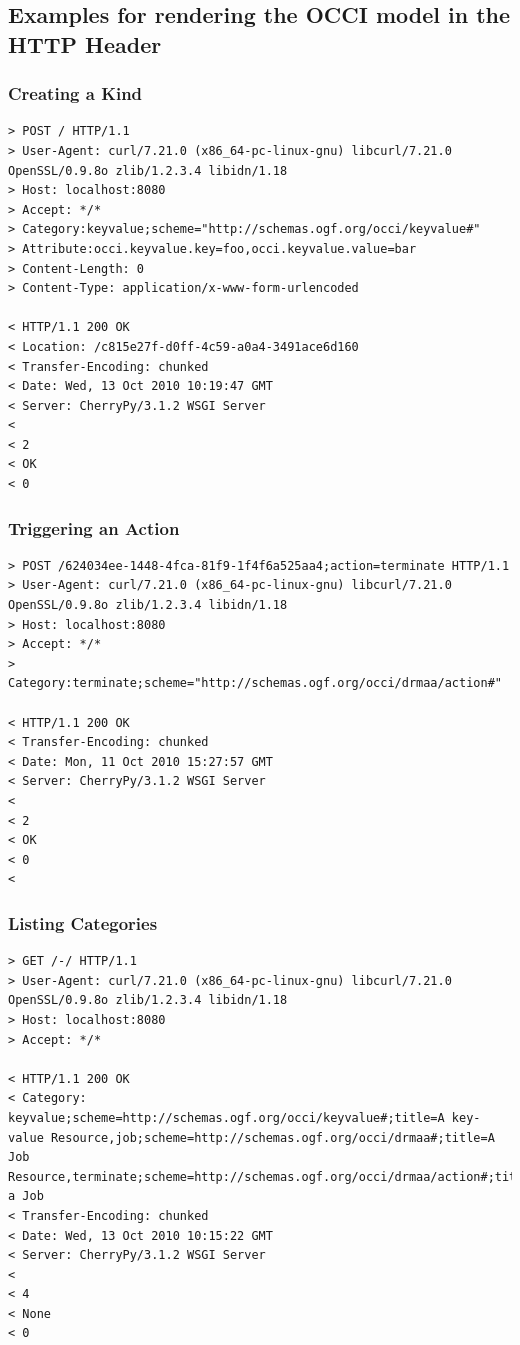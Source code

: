 \documentclass[10pt,a4paper]{article}
\begin{document}
\subsection{Examples for rendering the OCCI model in the HTTP Header}

\subsubsection{Creating a Kind}
\begin{verbatim}
> POST / HTTP/1.1
> User-Agent: curl/7.21.0 (x86_64-pc-linux-gnu) libcurl/7.21.0 OpenSSL/0.9.8o zlib/1.2.3.4 libidn/1.18
> Host: localhost:8080
> Accept: */*
> Category:keyvalue;scheme="http://schemas.ogf.org/occi/keyvalue#"
> Attribute:occi.keyvalue.key=foo,occi.keyvalue.value=bar
> Content-Length: 0
> Content-Type: application/x-www-form-urlencoded

< HTTP/1.1 200 OK
< Location: /c815e27f-d0ff-4c59-a0a4-3491ace6d160
< Transfer-Encoding: chunked
< Date: Wed, 13 Oct 2010 10:19:47 GMT
< Server: CherryPy/3.1.2 WSGI Server
< 
< 2
< OK
< 0
\end{verbatim}

\subsubsection{Triggering an Action}

\begin{verbatim}
> POST /624034ee-1448-4fca-81f9-1f4f6a525aa4;action=terminate HTTP/1.1
> User-Agent: curl/7.21.0 (x86_64-pc-linux-gnu) libcurl/7.21.0 OpenSSL/0.9.8o zlib/1.2.3.4 libidn/1.18
> Host: localhost:8080
> Accept: */*
> Category:terminate;scheme="http://schemas.ogf.org/occi/drmaa/action#"

< HTTP/1.1 200 OK
< Transfer-Encoding: chunked
< Date: Mon, 11 Oct 2010 15:27:57 GMT
< Server: CherryPy/3.1.2 WSGI Server
< 
< 2
< OK
< 0
<
\end{verbatim}

\subsubsection{Listing Categories}

\begin{verbatim}
> GET /-/ HTTP/1.1
> User-Agent: curl/7.21.0 (x86_64-pc-linux-gnu) libcurl/7.21.0 OpenSSL/0.9.8o zlib/1.2.3.4 libidn/1.18
> Host: localhost:8080
> Accept: */*

< HTTP/1.1 200 OK
< Category: keyvalue;scheme=http://schemas.ogf.org/occi/keyvalue#;title=A key-value Resource,job;scheme=http://schemas.ogf.org/occi/drmaa#;title=A Job Resource,terminate;scheme=http://schemas.ogf.org/occi/drmaa/action#;title=Terminate a Job
< Transfer-Encoding: chunked
< Date: Wed, 13 Oct 2010 10:15:22 GMT
< Server: CherryPy/3.1.2 WSGI Server
< 
< 4
< None
< 0
\end{verbatim}
\end{document}

